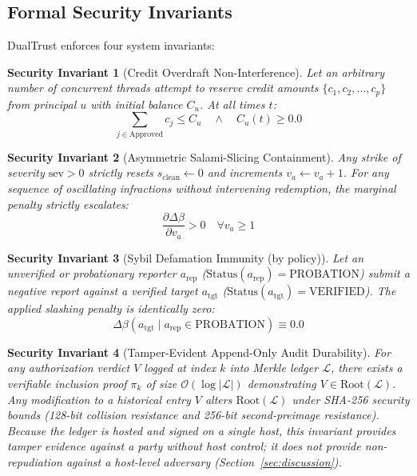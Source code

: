 \documentclass[manuscript, screen, review]{jair}
\newtheorem{invariant}{Security Invariant}
\begin{document}
\subsection{Formal Security Invariants}
DualTrust enforces four system invariants:

\begin{invariant}[Credit Overdraft Non-Interference]
\label{inv:credit}
Let an arbitrary number of concurrent threads attempt to reserve credit amounts $\{c_1, c_2, \dots, c_p\}$ from principal $u$ with initial balance $C_u$. At all times $t$:
\begin{equation}
\sum_{j \in \text{Approved}} c_j \le C_u \quad \land \quad C_u(t) \ge 0.0
\end{equation}
\end{invariant}

\begin{invariant}[Asymmetric Salami-Slicing Containment]
\label{inv:salami}
Any strike of severity $\text{sev} > 0$ strictly resets $s_{\text{clean}} \leftarrow 0$ and increments $v_a \leftarrow v_a + 1$. For any sequence of oscillating infractions without intervening redemption, the marginal penalty strictly escalates:
\begin{equation}
\frac{\partial \Delta\beta}{\partial v_a} > 0 \quad \forall v_a \ge 1
\end{equation}
\end{invariant}

\begin{invariant}[Sybil Defamation Immunity (by policy)]
\label{inv:sybil}
Let an unverified or probationary reporter $a_{\text{rep}}$ ($\text{Status}(a_{\text{rep}}) = \text{PROBATION}$) submit a negative report against a verified target $a_{\text{tgt}}$ ($\text{Status}(a_{\text{tgt}}) = \text{VERIFIED}$). The applied slashing penalty is identically zero:
\begin{equation}
\Delta\beta(a_{\text{tgt}} \mid a_{\text{rep}} \in \text{PROBATION}) \equiv 0.0
\end{equation}
\end{invariant}

\begin{invariant}[Tamper-Evident Append-Only Audit Durability]
\label{inv:audit}
For any authorization verdict $V$ logged at index $k$ into Merkle ledger $\mathcal{L}$, there exists a verifiable inclusion proof $\pi_k$ of size $\mathcal{O}(\log |\mathcal{L}|)$ demonstrating $V \in \text{Root}(\mathcal{L})$. Any modification to a historical entry $V$ alters $\text{Root}(\mathcal{L})$ under SHA-256 security bounds (128-bit collision resistance and 256-bit second-preimage resistance). Because the ledger is hosted and signed on a single host, this invariant provides tamper \emph{evidence} against a party without host control; it does not provide non-repudiation against a host-level adversary (Section~\ref{sec:discussion}).
\end{invariant}
\end{document}
